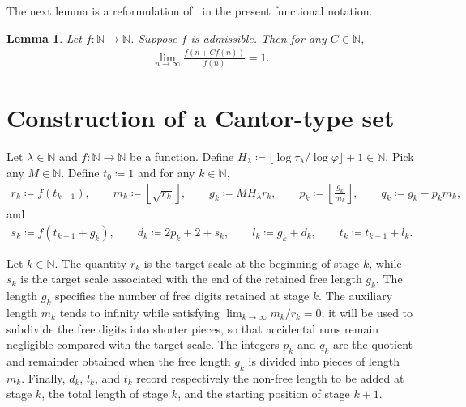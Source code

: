 \documentclass[12pt,reqno]{amsart}
\theoremstyle{definition}
\theoremstyle{plain}
\newtheorem{lemma}{Lemma}
\begin{document}
The next lemma is a reformulation of~\cite[Lemma~2.5]{WangWu2011} in the present functional notation.
\begin{lemma}
\label{lem:fixed-multiple-self-neglecting}
Let $f:\mathbb{N}\to\mathbb{N}$. 
Suppose $f$ is admissible. 
Then for any $C\in\mathbb{N}$,
\begin{align*}
    \lim_{n\to\infty}\frac{f(n+C f(n))}{f(n)}
    =1.
\end{align*}
\end{lemma}

\section{Construction of a Cantor-type set}

Let $\lambda\in\mathbb{N}$ and $f:\mathbb{N}\to\mathbb{N}$ be a function. Define $H_\lambda\coloneqq\lfloor{\log{\tau_{\lambda}}}/{\log{\varphi}}\rfloor+1\in\mathbb{N}$. Pick any $M\in\mathbb{N}$. Define $t_0\coloneqq 1$ and for any $k\in\mathbb{N}$,
\begin{align*}
    r_k\coloneqq f(t_{k-1}),\qquad
    m_k\coloneqq \left\lfloor\sqrt{r_k}\right\rfloor, \qquad
    g_k\coloneqq MH_\lambda r_k, \qquad
    p_k\coloneqq \left\lfloor \frac{g_k}{m_k}\right\rfloor, \qquad
    q_k\coloneqq g_k-p_km_k,
\end{align*}
and
\begin{align*}
    s_k\coloneqq f(t_{k-1}+g_k), \qquad 
    d_k\coloneqq 2p_k+2+s_k, \qquad 
    l_k\coloneqq g_k+d_k, \qquad 
    t_k\coloneqq t_{k-1}+l_k.
\end{align*}

Let $k\in\mathbb{N}$. The quantity $r_k$ is the target scale at the beginning of stage $k$, while $s_k$ is the target scale associated with the end of the retained free length $g_k$. The length $g_k$ specifies the number of free digits retained at stage $k$. The auxiliary length $m_k$ tends to infinity while satisfying $\lim_{k\to\infty}m_k/r_k=0$; it will be used to subdivide the free digits into shorter pieces, so that accidental runs remain negligible compared with the target scale. The integers $p_k$ and $q_k$ are the quotient and remainder obtained when the free length $g_k$ is divided into pieces of length $m_k$. Finally, $d_k$, $l_k$, and $t_k$ record respectively the non-free length to be added at stage $k$, the total length of stage $k$, and the starting position of stage $k+1$.
\end{document}
